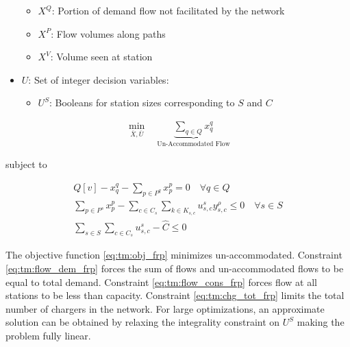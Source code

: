 \documentclass[12pt]{article}
\begin{document}
\begin{itemize}
\begin{itemize}
		\item $X^Q$: Portion of demand flow not facilitated by the network
		\item $X^P$: Flow volumes along paths
		\item $X^V$: Volume seen at station
	\end{itemize}
	\item $U$: Set of integer decision variables: \begin{itemize}
		\item $U^S$: Booleans for station sizes corresponding to $S$ and $C$
	\end{itemize}
\end{itemize}


\begin{gather}
	\min_{\overline{X},\overline{U}}\quad \underbrace{\sum_{q \in Q} x^q_q}_{\text{Un-Accommodated Flow}}\label{eq:tm:obj_frp}
\end{gather}

subject to

\begin{gather}
	Q[v] - x^q_q - \sum_{p \in P^q}x^p_p = 0 \quad \forall q \in Q \label{eq:tm:flow_dem_frp} \\
	\sum_{p \in P^s} x^p_p - \sum_{c \in C_s}
	\sum_{k \in K_{s, c}} u^s_{s, c}y^\rho_{s, c} \leq 0 \quad \forall s \in S \label{eq:tm:flow_cons_frp} \\
	\sum_{s \in S}\sum_{c \in C_s} u^s_{s, c} - \hat{C} \leq 0 \label{eq:tm:chg_tot_frp}
\end{gather}

The objective function \eqref{eq:tm:obj_frp} minimizes un-accommodated. Constraint \eqref{eq:tm:flow_dem_frp} forces the sum of flows and un-accommodated flows to be equal to total demand. Constraint \eqref{eq:tm:flow_cons_frp} forces flow at all stations to be less than capacity. Constraint \eqref{eq:tm:chg_tot_frp} limits the total number of chargers in the network. For large optimizations, an approximate solution can be obtained by relaxing the integrality constraint on $U^S$ making the problem fully linear.
\end{document}
